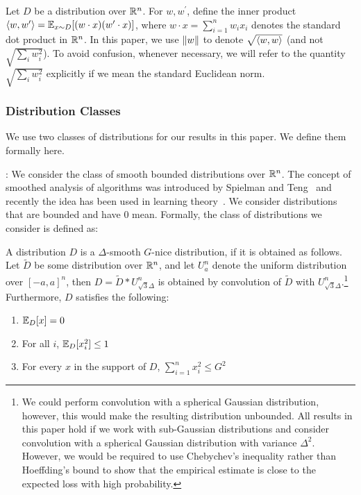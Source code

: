 Let $D$ be a distribution over $\mathbb{R}^n$. For $w, w^\prime$, define the inner
product $\langle w, w^\prime \rangle = \mathbb{E}_{x \sim D}[(w \cdot x) (w^\prime \cdot x)]$,
where $w \cdot x = \sum_{i = 1}^n w_i x_i$ denotes the standard dot product in
$\mathbb{R}^n$. In this paper, we use $\Vert w \Vert$ to denote $\sqrt{\langle w, w \rangle}$
(and not $\sqrt{\sum_{i} w_i^2}$). To avoid confusion, whenever necessary, we
will refer to the quantity $\sqrt{\sum_{i} w_i^2}$ explicitly if we mean the
standard Euclidean norm. 
%
%

\subsubsection*{Distribution Classes}

We use two classes of distributions for our results in this paper. We define
them formally here. \medskip 

: We consider the class of smooth
bounded distributions over $\mathbb{R}^n$. The concept of smoothed analysis of
algorithms was introduced by Spielman and Teng~\cite{ST:2004} and recently the
idea has been used in learning theory~\cite{KST:2009,KKM:2013}. We consider
distributions that are bounded and have $0$ mean. Formally, the class of
distributions we consider is defined as:

\begin{definition}
\label{defn:afghanistan} A distribution $D$ is a $\Delta$-smooth $G$-nice
distribution, if it is obtained as follows. Let $\tilde{D}$ be some distribution
over $\mathbb{R}^n$, and let $U^n_a$ denote the uniform distribution over $[-a,
a]^n$, then $D = \tilde{D} * U^n_{\sqrt{3}\Delta}$ is obtained by convolution of
$\tilde{D}$ with $U^n_{\sqrt{3} \Delta}$.\footnote{We could perform convolution
with a spherical Gaussian distribution, however, this would make the resulting
distribution unbounded. All results in this paper hold if we work with
sub-Gaussian distributions and consider convolution with a spherical Gaussian
distribution with variance $\Delta^2$.  However, we would be required to use
Chebychev's inequality rather than Hoeffding's bound to show that the empirical
estimate is close to the expected loss with high probability.} Furthermore, $D$
satisfies the following:
\begin{enumerate}
\item $\mathbb{E}_D[x] = 0$
\item For all $i$, $\mathbb{E}_D[x_i^2] \leq 1$
\item For every $x$ in the support of $D$, $\sum_{i = 1}^n x_i^2 \leq G^2$
\end{enumerate}
\end{definition}

